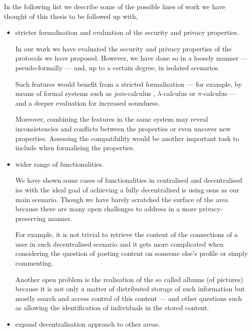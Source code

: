 In the following list we describe some of the possible lines of work we have thought 
of this thesis to be followed up with,
\begin{itemize}[topsep=\parskip, parsep=\parskip, itemsep=\parskip]
    
    \item stricter formalisation and evaluation of the security and privacy properties.
    
    In our work we have evaluated the security and privacy properties of the protocols 
    we have proposed. However, we have done so in a loosely manner --- pseudo-formally 
    --- and, up to a certain degree, in isolated scenarios.
    
    Such features would benefit from a stricted formalisation --- for example, by 
    means of formal systems such as \emph{join}-calculus \cite{FournetG96}, \(\lambda\)-calculus 
    \cite{Church36} or \(\pi\)-calculus \cite{MilnerPW92} --- and a deeper evaluation 
    for increased soundness.
    
    Moreover, combining the features in the same system may reveal inconsistencies 
    and conflicts between the properties or even uncover new properties. Assessing 
    the compatibility would be another important task to include when formalising 
    the properties.
    
    \item wider range of functionalities.
    
    We have shown some cases of functionalities in centralised and decentralised 
    \acp{is} with the ideal goal of achieving a fully decentralised \ac{is} using 
    \acp{osn} as our main scenario. Though we have barely scratched the surface 
    of the area because there are many open challenges to address in a more privacy-preserving 
    manner.
    
    For example, it is not trivial to retrieve the content of the connections of 
    a user in such decentralised scenario and it gets more complicated when considering 
    the question of posting content on someone else's profile or simply commenting. 
    
    Another open problem is the realisation of the so called albums (of pictures) 
    because it is not only a matter of distributed storage of such information but 
    mostly search and access control of this content --- and other questions such 
    as allowing the identification of individuals in the stored content.
    
    \item expand decentralisation approach to other areas.
    

\end{itemize}
